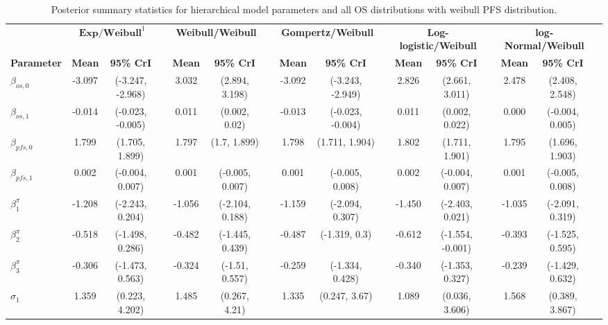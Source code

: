 \documentclass[AMA,STIX1COL]{WileyNJD-v2}
\begin{document}
\begin{landscape}
\begin{center}
\begin{table}[t]
\caption{Posterior summary statistics for hierarchical model parameters and all OS distributions with weibull PFS distribution. \label{tab:post_hier_pfs_weibull}}
\centering
\begin{tabular}{l c c c c c c c c c c c c c c c}
\toprule
\multicolumn{1}{l}{} & \multicolumn{2}{c}{$\textbf{Exp/Weibull}^1$} & & \multicolumn{2}{c}{\textbf{Weibull/Weibull}} & & \multicolumn{2}{c}{\textbf{Gompertz/Weibull}} & & \multicolumn{2}{c}{\textbf{Log-logistic/Weibull}} & & \multicolumn{2}{c}{\textbf{log-Normal/Weibull}}\\
\cmidrule{2-3}\cmidrule{5-6}\cmidrule{8-9}\cmidrule{11-12}\cmidrule{14-15}
\textbf{Parameter} & \textbf{Mean} & \textbf{95\% CrI} & & \textbf{Mean} & \textbf{95\% CrI} & & \textbf{Mean} & \textbf{95\% CrI} & & \textbf{Mean} & \textbf{95\% CrI} & & \textbf{Mean} & \textbf{95\% CrI}\\
\midrule
$\beta_{os, 0}$ & -3.097 & (-3.247, -2.968) &  & 3.032 & (2.894, 3.198) &  & -3.092 & (-3.243, -2.949) &  & 2.826 & (2.661, 3.011) &  & 2.478 & (2.408, 2.548) & \\
$\beta_{os, 1}$ & -0.014 & (-0.023, -0.005) &  & 0.011 & (0.002, 0.02) &  & -0.013 & (-0.023, -0.004) &  & 0.011 & (0.002, 0.022) &  & 0.000 & (-0.004, 0.005) & \\
$\beta_{pfs, 0}$ & 1.799 & (1.705, 1.899) &  & 1.797 & (1.7, 1.899) &  & 1.798 & (1.711, 1.904) &  & 1.802 & (1.711, 1.901) &  & 1.795 & (1.696, 1.903) & \\
$\beta_{pfs, 1}$ & 0.002 & (-0.004, 0.007) &  & 0.001 & (-0.005, 0.007) &  & 0.001 & (-0.005, 0.008) &  & 0.002 & (-0.004, 0.007) &  & 0.001 & (-0.005, 0.008) & \\
$\beta^{\pi}_1$ & -1.208 & (-2.243, 0.204) &  & -1.056 & (-2.104, 0.188) &  & -1.159 & (-2.094, 0.307) &  & -1.450 & (-2.403, 0.021) &  & -1.035 & (-2.091, 0.319) & \\
$\beta^{\pi}_2$ & -0.518 & (-1.498, 0.286) &  & -0.482 & (-1.445, 0.439) &  & -0.487 & (-1.319, 0.3) &  & -0.612 & (-1.554, -0.001) &  & -0.393 & (-1.525, 0.595) & \\
$\beta^{\pi}_3$ & -0.306 & (-1.473, 0.563) &  & -0.324 & (-1.51, 0.557) &  & -0.259 & (-1.334, 0.428) &  & -0.340 & (-1.353, 0.327) &  & -0.239 & (-1.429, 0.632) & \\
$\sigma_1$ & 1.359 & (0.223, 4.202) &  & 1.485 & (0.267, 4.21) &  & 1.335 & (0.247, 3.67) &  & 1.089 & (0.036, 3.606) &  & 1.568 & (0.389, 3.867) & \\

\end{tabular}
\end{table}
\end{center}
\end{landscape}
\end{document}
